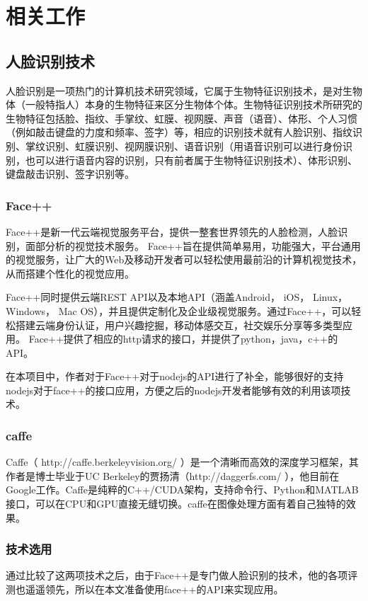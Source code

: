 
\chapter{相关工作}


\section{人脸识别技术}
人脸识别\parencite{faceR}是一项热门的计算机技术研究领域，它属于生物特征识别技术，是对生物体（一般特指人）本身的生物特征来区分生物体个体。生物特征识别技术所研究的生物特征包括脸、指纹、手掌纹、虹膜、视网膜、声音（语音）、体形、个人习惯（例如敲击键盘的力度和频率、签字）等，相应的识别技术就有人脸识别、指纹识别、掌纹识别、虹膜识别、视网膜识别、语音识别（用语音识别可以进行身份识别，也可以进行语音内容的识别，只有前者属于生物特征识别技术）、体形识别、键盘敲击识别、签字识别等。
\subsection{Face++}
Face++是新一代云端视觉服务平台，提供一整套世界领先的人脸检测，人脸识别，面部分析的视觉技术服务。
Face++旨在提供简单易用，功能强大，平台通用的视觉服务，让广大的Web及移动开发者可以轻松使用最前沿的计算机视觉技术，从而搭建个性化的视觉应用。

Face++同时提供云端REST API以及本地API（涵盖Android， iOS， Linux， Windows， Mac OS），并且提供定制化及企业级视觉服务。通过Face++，可以轻松搭建云端身份认证，用户兴趣挖掘，移动体感交互，社交娱乐分享等多类型应用。
Face++提供了相应的http请求的接口，并提供了python，java，c++的API。

在本项目中，作者对于Face++对于nodejs的API进行了补全，能够很好的支持nodejs对于face++的接口应用，方便之后的nodejs开发者能够有效的利用该项技术。

\subsection{caffe}
Caffe（ http://caffe.berkeleyvision.org/ ）是一个清晰而高效的深度学习框架，其作者是博士毕业于UC Berkeley的贾扬清（http://daggerfs.com/ ），他目前在Google工作。Caffe是纯粹的C++/CUDA架构，支持命令行、Python和MATLAB接口，可以在CPU和GPU直接无缝切换。caffe在图像处理方面有着自己独特的效果。

\subsection{技术选用}
通过比较了这两项技术之后，由于Face++是专门做人脸识别的技术，他的各项评测也遥遥领先，所以在本文准备使用face++的API来实现应用。


